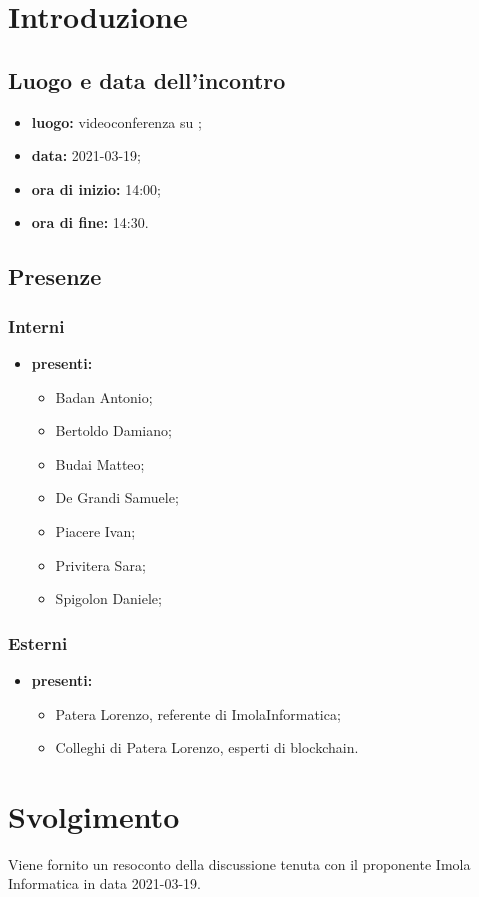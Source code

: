 \section*{Introduzione}
\subsection*{Luogo e data dell'incontro}
\begin{itemize}
	\item \textbf{luogo:} videoconferenza su ;
	\item \textbf{data:} 2021-03-19;
	\item \textbf{ora di inizio:} 14:00;
	\item \textbf{ora di fine:} 14:30.
\end{itemize}
\subsection*{Presenze}
\subsubsection*{Interni}
\begin{itemize}
	\item \textbf{presenti: }
	\begin{itemize}
		\item Badan Antonio;
		\item Bertoldo Damiano;
		\item Budai Matteo;
		\item De Grandi Samuele;
		\item Piacere Ivan;
		\item Privitera Sara;
		\item Spigolon Daniele;
	\end{itemize}
\end{itemize}
\subsubsection*{Esterni}
\begin{itemize}
	\item \textbf{presenti: }
	\begin{itemize}
		\item Patera Lorenzo, referente di ImolaInformatica;
		\item Colleghi di Patera Lorenzo, esperti di blockchain.
	\end{itemize}
\end{itemize}
\section{Svolgimento}
Viene fornito un resoconto della discussione tenuta con il proponente Imola Informatica in data 2021-03-19.


